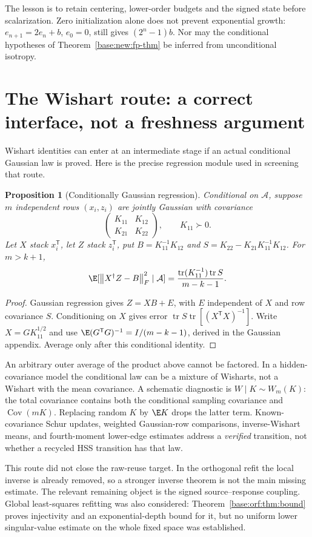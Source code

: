 \documentclass[11pt,oneside,openany,a4paper]{book}
\numberwithin{equation}{chapter}
\newtheorem{proposition}[theorem]{Proposition}
\theoremstyle{definition}
\theoremstyle{remark}
\newcommand{\T}{\mathsf T}\newcommand{\Id}{I}
\newcommand{\F}[1]{\left\lVert#1\right\rVert_F}
\DeclareMathOperator{\tr}{tr}\DeclareMathOperator{\rank}{rank}
\begin{document}
The lesson is to retain centering, lower-order budgets and the signed state before scalarization. Zero initialization alone does not prevent exponential growth: $e_{n+1}=2e_n+b$, $e_0=0$, still gives $(2^n-1)b$. Nor may the conditional hypotheses of Theorem~\ref{base:new:fp-thm} be inferred from unconditional isotropy.

\section{The Wishart route: a correct interface, not a freshness argument}\label{base:new:wishart}
Wishart identities can enter at an intermediate stage if an actual conditional Gaussian law is proved. Here is the precise regression module used in screening that route.
\begin{proposition}[Conditionally Gaussian regression]
Conditional on $\mathcal A$, suppose $m$ independent rows $(x_i,z_i)$ are jointly Gaussian with covariance
\[
 \begin{pmatrix}K_{11}&K_{12}\\K_{21}&K_{22}\end{pmatrix},\qquad K_{11}\succ0.
\]
Let $X$ stack $x_i^\T$, let $Z$ stack $z_i^\T$, put $B=K_{11}^{-1}K_{12}$ and $S=K_{22}-K_{21}K_{11}^{-1}K_{12}$. For $m>k+1$,
\[
 \E[\F{X^\dagger Z-B}^2\mid\mathcal A]
 =\frac{\tr(K_{11}^{-1})\tr S}{m-k-1}.
\]
\end{proposition}
\begin{proof}
Gaussian regression gives $Z=XB+E$, with $E$ independent of $X$ and row covariance $S$. Conditioning on $X$ gives error $\tr S\tr[(X^\T X)^{-1}]$. Write $X=GK_{11}^{1/2}$ and use $\E(G^\T G)^{-1}=I/(m-k-1)$, derived in the Gaussian appendix. Average only after this conditional identity.
\end{proof}
An arbitrary outer average of the product above cannot be factored. In a hidden-covariance model the conditional law can be a mixture of Wisharts, not a Wishart with the mean covariance. A schematic diagnostic is $W\mid K\sim W_m(K)$: the total covariance contains both the conditional sampling covariance and $\operatorname{Cov}(mK)$. Replacing random $K$ by $\E K$ drops the latter term. Known-covariance Schur updates, weighted Gaussian-row comparisons, inverse-Wishart means, and fourth-moment lower-edge estimates address a \emph{verified} transition, not whether a recycled HSS transition has that law.

This route did not close the raw-reuse target. In the orthogonal refit the local inverse is already removed, so a stronger inverse theorem is not the main missing estimate. The relevant remaining object is the signed source--response coupling. Global least-squares refitting was also considered: Theorem~\ref{base:orf:thm:bound} proves injectivity and an exponential-depth bound for it, but no uniform lower singular-value estimate on the whole fixed space was established.
\end{document}
